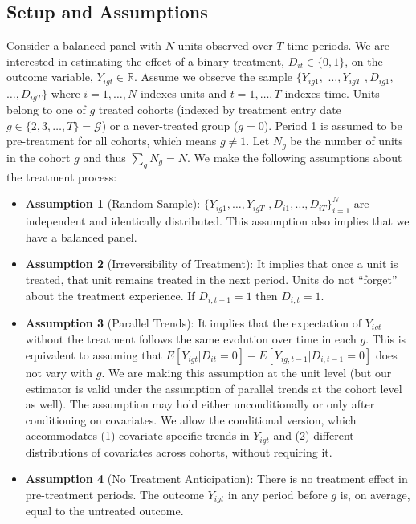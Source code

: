 \documentclass[margin=5in, 12pt]{article}
\newcommand{\1}{\mathbbm{1}}
\begin{document}
\subsection{Setup and Assumptions}
Consider a balanced panel with $N$ units observed over $T$ time periods. We are interested in estimating the effect of a binary treatment, $D_{it} \in \{0,1\}$, on the outcome variable, $Y_{igt} \in \mathbb{R}$. Assume we observe the sample $\{Y_{ig1},$ $\dotsc,Y_{igT}$ $,D_{ig1},$ $\dotsc,D_{igT}\}$ where $i = 1,\dotsc, N$ indexes units and $t = 1,\dotsc, T$ indexes time. Units belong to one of $g$ treated cohorts (indexed by treatment entry date $g \in \{2,3,\dotsc,T\} = \mathcal{G}$) or a never-treated group ($g=0$). Period 1 is assumed to be pre-treatment for all cohorts, which means $g\neq 1$. Let $N_g$ be the number of units in the cohort $g$ and thus $\sum_{g}N_g = N$. We make the following assumptions about the treatment process:

\begin{itemize}
    \item[] \textbf{Assumption 1} (Random Sample): $\{Y_{ig1},\dotsc,Y_{igT}$ $,D_{i1},\dotsc,D_{iT}\}_{i=1}^{N}$ are independent and identically distributed. This assumption also implies that we have a balanced panel.
    \item[] \textbf{Assumption 2} (Irreversibility of Treatment): It implies that once a unit is treated, that unit remains treated in the next period. Units do not ``forget'' about the treatment experience. If $D_{i,t-1} = 1$ then $D_{i,t} = 1$.
    \item[] \textbf{Assumption 3} (Parallel Trends): It implies that the expectation of $Y_{igt}$ without the treatment follows the same evolution over time in each $g$. This is equivalent to assuming that $E[Y_{igt}|D_{it} = 0] - E[Y_{ig,t-1}|D_{i,t-1} = 0]$ does not vary with $g$. We are making this assumption at the unit level (but our estimator is valid under the assumption of parallel trends at the cohort level as well). The assumption may hold either unconditionally or only after conditioning on covariates. We allow the conditional version, which accommodates (1) covariate-specific trends in $Y_{igt}$ and (2) different distributions of covariates across cohorts, without requiring it.
    \item[] \textbf{Assumption 4} (No Treatment Anticipation): There is no treatment effect in pre-treatment periods. The outcome $Y_{igt}$ in any period before $g$ is, on average, equal to the untreated outcome.
\end{itemize}
\end{document}
